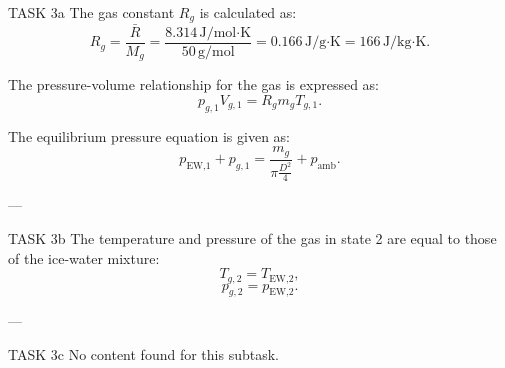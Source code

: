 TASK 3a  
The gas constant \( R_g \) is calculated as:  
\[
R_g = \frac{\bar{R}}{M_g} = \frac{8.314 \, \text{J/mol·K}}{50 \, \text{g/mol}} = 0.166 \, \text{J/g·K} = 166 \, \text{J/kg·K}.
\]

The pressure-volume relationship for the gas is expressed as:  
\[
p_{g,1} V_{g,1} = R_g m_g T_{g,1}.
\]

The equilibrium pressure equation is given as:  
\[
p_{\text{EW,1}} + p_{g,1} = \frac{m_g}{\pi \frac{D^2}{4}} + p_{\text{amb}}.
\]

---

TASK 3b  
The temperature and pressure of the gas in state 2 are equal to those of the ice-water mixture:  
\[
T_{g,2} = T_{\text{EW,2}},
\]
\[
p_{g,2} = p_{\text{EW,2}}.
\]

---

TASK 3c  
No content found for this subtask.